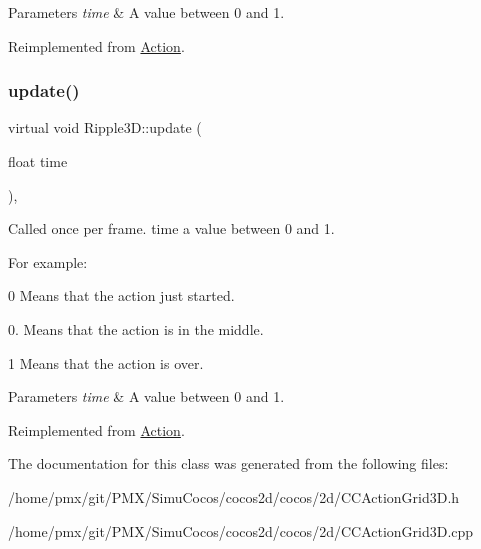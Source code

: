 \begin{DoxyParams}{Parameters}
{\em time} & A value between 0 and 1. \\
\hline
\end{DoxyParams}


Reimplemented from \hyperlink{classAction_a937e646e63915e33ad05ba149bfcf239}{Action}.

\mbox{\label{classRipple3D_a4e6defdbc62289aa7009987464878a1d}} 
\subsubsection{\texorpdfstring{update()}{update()}\hspace{0.1cm}{\footnotesize\ttfamily [2/2]}}
{\footnotesize\ttfamily virtual void Ripple3\+D\+::update (\begin{DoxyParamCaption}\item[{float}]{time }\end{DoxyParamCaption})\hspace{0.3cm}{\ttfamily [override]}, {\ttfamily [virtual]}}

Called once per frame. time a value between 0 and 1.

For example\+:
\begin{DoxyItemize}
\item 0 Means that the action just started.
\item 0. Means that the action is in the middle.
\item 1 Means that the action is over.
\end{DoxyItemize}


\begin{DoxyParams}{Parameters}
{\em time} & A value between 0 and 1. \\
\hline
\end{DoxyParams}


Reimplemented from \hyperlink{classAction_a937e646e63915e33ad05ba149bfcf239}{Action}.



The documentation for this class was generated from the following files\+:\begin{DoxyCompactItemize}
\item 
/home/pmx/git/\+P\+M\+X/\+Simu\+Cocos/cocos2d/cocos/2d/C\+C\+Action\+Grid3\+D.\+h\item 
/home/pmx/git/\+P\+M\+X/\+Simu\+Cocos/cocos2d/cocos/2d/C\+C\+Action\+Grid3\+D.\+cpp\end{DoxyCompactItemize}
